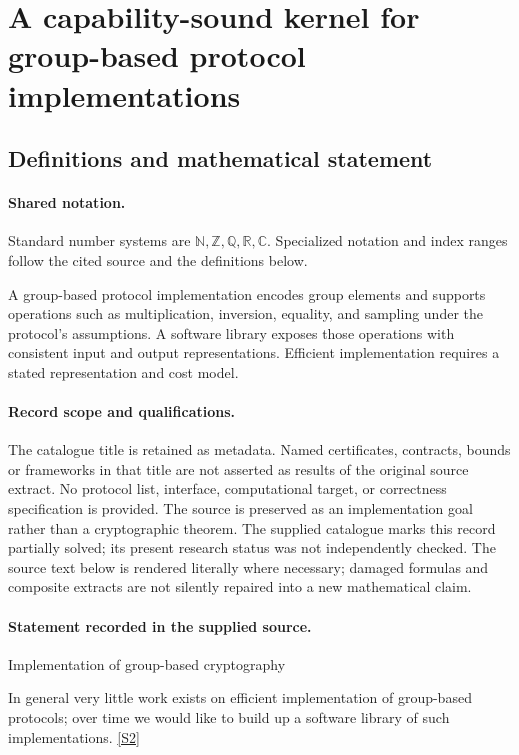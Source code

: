 \documentclass[11pt]{article}
\newcommand{\sref}[2]{\hyperlink{source:#1:#2}{[S#2]}}
\begin{document}
\section{A capability-sound kernel for group-based protocol implementations}\label{statement}

\subsection{Definitions and mathematical statement}

\paragraph{Shared notation.}Standard number systems are $\mathbb N,\mathbb Z,\mathbb Q,\mathbb R,\mathbb C$. Specialized notation and index ranges follow the cited source and the definitions below.


A group-based protocol implementation encodes group elements and supports operations such as multiplication, inversion, equality, and sampling under the protocol's assumptions. A software library exposes those operations with consistent input and output representations. Efficient implementation requires a stated representation and cost model.
\paragraph{Record scope and qualifications.}
The catalogue title is retained as metadata. Named certificates, contracts, bounds or frameworks in that title are not asserted as results of the original source extract.
No protocol list, interface, computational target, or correctness specification is provided. The source is preserved as an implementation goal rather than a cryptographic theorem. The supplied catalogue marks this record partially solved; its present research status was not independently checked.
The source text below is rendered literally where necessary; damaged formulas and composite extracts are not silently repaired into a new mathematical claim.
\paragraph{Statement recorded in the supplied source.}
Implementation of group-based cryptography

In general very little work exists on efficient implementation of group-based protocols; over time we would like to build up a software library of such implementations. \sref{statement}{2}
\end{document}
